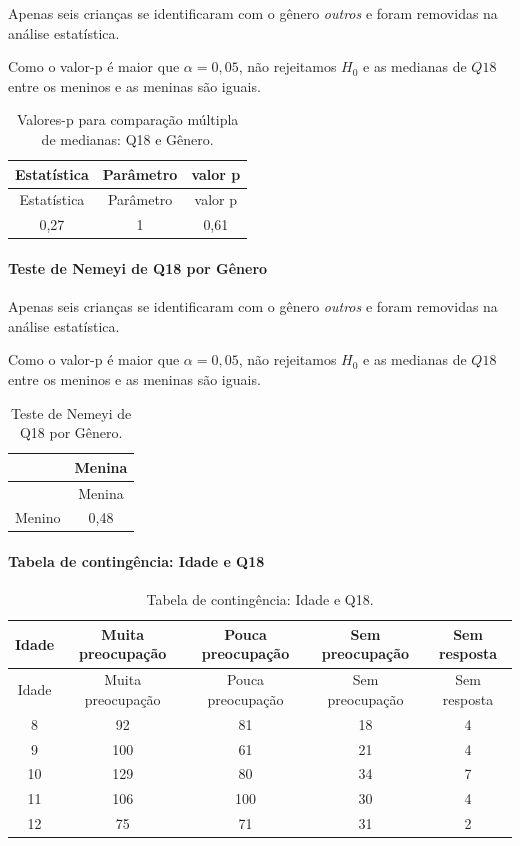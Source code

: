 \documentclass[]{article}
\let\oldparagraph\paragraph
\renewcommand{\paragraph}[1]{\oldparagraph{#1}\mbox{}}
\begin{document}
Apenas seis crianças se identificaram com o gênero \emph{outros} e foram removidas na análise estatística.

Como o valor-p é maior que \(\alpha=0,05\), não rejeitamos \(H_0\) e as medianas de \(Q18\) entre os meninos e as meninas são iguais.

\begin{longtable}[]{@{}ccc@{}}
\caption{\label{tab:unnamed-chunk-231}Valores-p para comparação múltipla de medianas: Q18 e Gênero.}\tabularnewline
\toprule
Estatística & Parâmetro & valor p\tabularnewline
\midrule
\endfirsthead
\toprule
Estatística & Parâmetro & valor p\tabularnewline
\midrule
\endhead
0,27 & 1 & 0,61\tabularnewline
\bottomrule
\end{longtable}

\hypertarget{teste-de-nemeyi-de-q18-por-guxeanero}{%
\paragraph{Teste de Nemeyi de Q18 por Gênero}\label{teste-de-nemeyi-de-q18-por-guxeanero}}

Apenas seis crianças se identificaram com o gênero \emph{outros} e foram removidas na análise estatística.

Como o valor-p é maior que \(\alpha=0,05\), não rejeitamos \(H_0\) e as medianas de \(Q18\) entre os meninos e as meninas são iguais.

\begin{longtable}[]{@{}lc@{}}
\caption{\label{tab:unnamed-chunk-232}Teste de Nemeyi de Q18 por Gênero.}\tabularnewline
\toprule
& Menina\tabularnewline
\midrule
\endfirsthead
\toprule
& Menina\tabularnewline
\midrule
\endhead
Menino & 0,48\tabularnewline
\bottomrule
\end{longtable}

\cleardoublepage

\hypertarget{tabela-de-continguxeancia-idade-e-q18}{%
\paragraph{Tabela de contingência: Idade e Q18}\label{tabela-de-continguxeancia-idade-e-q18}}

\begin{longtable}[]{@{}ccccc@{}}
\caption{\label{tab:unnamed-chunk-233}Tabela de contingência: Idade e Q18.}\tabularnewline
\toprule
Idade & Muita preocupação & Pouca preocupação & Sem preocupação & Sem resposta\tabularnewline
\midrule
\endfirsthead
\toprule
Idade & Muita preocupação & Pouca preocupação & Sem preocupação & Sem resposta\tabularnewline
\midrule
\endhead
8 & 92 & 81 & 18 & 4\tabularnewline
9 & 100 & 61 & 21 & 4\tabularnewline
10 & 129 & 80 & 34 & 7\tabularnewline
11 & 106 & 100 & 30 & 4\tabularnewline
12 & 75 & 71 & 31 & 2\tabularnewline
\bottomrule
\end{longtable}
\end{document}
